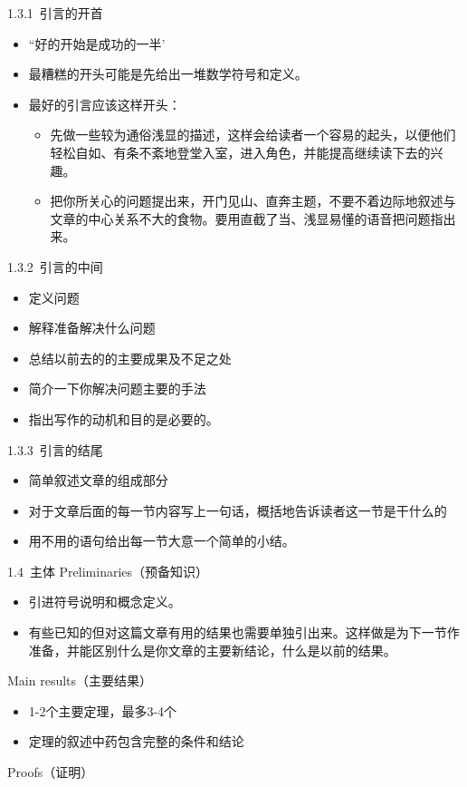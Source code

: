 \documentclass[13pt,fontset=mac]{ctexbeamer}
\begin{document}
\begin{frame}{1.3.1~引言的开首}
		\begin{itemize}
		\item ``好的开始是成功的一半'

		\item 最糟糕的开头可能是先给出一堆数学符号和定义。

		\item  最好的引言应该这样开头：
	\begin{itemize}
		\item 先做一些较为通俗浅显的描述，这样会给读者一个容易的起头，以便他们轻松自如、有条不紊地登堂入室，进入角色，并能提高继续读下去的兴趣。
		\item  把你所关心的问题提出来，开门见山、直奔主题，不要不着边际地叙述与文章的中心关系不大的食物。要用直截了当、浅显易懂的语音把问题指出来。
	\end{itemize}
	\end{itemize}
\end{frame}


\begin{frame}{1.3.2~引言的中间}
	\begin{itemize}
		
		\item 定义问题
		
		\item 解释准备解决什么问题
		\item 总结以前去的的主要成果及不足之处
		\item 简介一下你解决问题主要的手法
		\item 指出写作的动机和目的是必要的。
	\end{itemize}
\end{frame}

\begin{frame}{1.3.3~引言的结尾}
	\begin{itemize}
		
		\item 简单叙述文章的组成部分
		
		\item 对于文章后面的每一节内容写上一句话，概括地告诉读者这一节是干什么的
		\item 用不用的语句给出每一节大意一个简单的小结。
	\end{itemize}
\end{frame}


\begin{frame}{1.4~主体}
	Preliminaries（预备知识）
	\begin{itemize}
		\item  引进符号说明和概念定义。
		\item  有些已知的但对这篇文章有用的结果也需要单独引出来。这样做是为下一节作准备，并能区别什么是你文章的主要新结论，什么是以前的结果。
	\end{itemize}
	Main results（主要结果）
		\begin{itemize}
		\item  1-2个主要定理，最多3-4个
		\item 定理的叙述中药包含完整的条件和结论
	\end{itemize}

Proofs（证明）
\end{frame}
\end{document}
